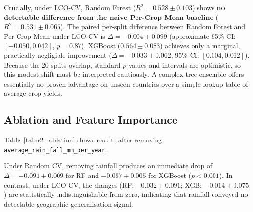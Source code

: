 \documentclass[conference]{IEEEtran}
\begin{document}
Crucially, under LCO-CV, Random Forest ($R^2 = 0.528 \pm 0.103$) shows 
\textbf{no detectable difference from the naive Per-Crop Mean baseline} 
($R^2 = 0.531 \pm 0.065$). The paired per-split difference between Random Forest 
and Per-Crop Mean under LCO-CV is $\Delta = -0.004 \pm 0.099$ (approximate 95\% CI: 
$[-0.050, 0.042]$, $p = 0.87$). XGBoost ($0.564 \pm 0.083$) achieves only a 
marginal, practically negligible improvement ($\Delta = +0.033 \pm 0.062$, 95\% CI: 
$[0.004, 0.062]$). Because the 20 splits overlap, standard $p$-values and intervals 
are optimistic, so this modest shift must be interpreted cautiously. A complex tree 
ensemble offers essentially no proven advantage on unseen countries over a simple 
lookup table of average crop yields.

\subsection{Ablation and Feature Importance}

Table~\ref{tab:r2_ablation} shows results after removing \texttt{average\_rain\_fall\_mm\_per\_year}.

\begin{table}[t]
\centering
\caption{$R^2$ by Model and Protocol (No-Rainfall Ablation, mean $\pm$ SD)}
\label{tab:r2_ablation}
\end{table}

Under Random CV, removing rainfall produces an immediate drop of 
$\Delta = -0.091 \pm 0.009$ for RF and $-0.087 \pm 0.005$ for XGBoost ($p < 0.001$). 
In contrast, under LCO-CV, the changes (RF: $-0.032 \pm 0.091$; XGB: $-0.014 \pm 0.075$) 
are statistically indistinguishable from zero, indicating that rainfall conveyed no 
detectable geographic generalisation signal.
\end{document}
